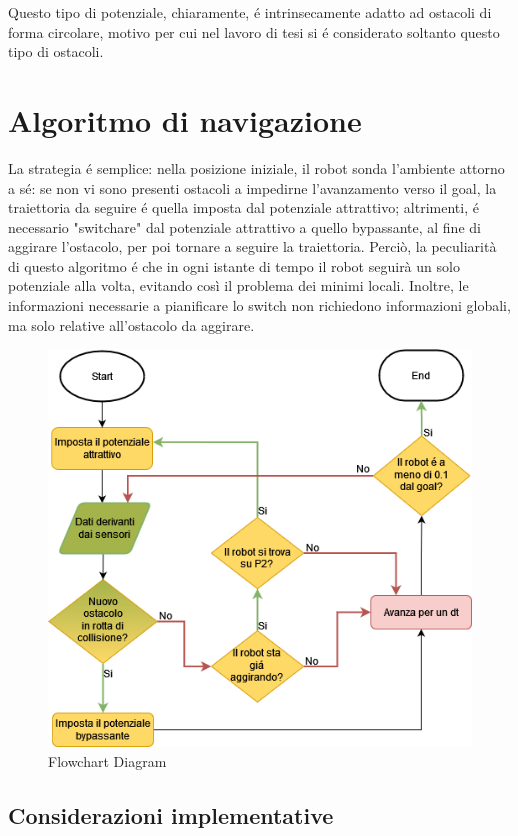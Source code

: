 \documentclass[14pt,a4paper]{extarticle}
\begin{document}
Questo tipo di potenziale, chiaramente, é intrinsecamente adatto ad ostacoli di forma circolare, motivo per cui nel lavoro di tesi si é considerato soltanto questo tipo di ostacoli.

\section{Algoritmo di navigazione\cite{dalfonso}} 
La strategia é semplice: nella posizione iniziale, il robot sonda l'ambiente attorno a sé: se non vi sono presenti ostacoli a impedirne l'avanzamento verso il goal, la traiettoria da seguire é quella imposta dal potenziale attrattivo; altrimenti, é necessario "switchare" dal potenziale attrattivo a quello bypassante, al fine di aggirare l'ostacolo, per poi tornare a seguire la traiettoria. Perciò, la peculiarità di questo algoritmo é che in ogni istante di tempo il robot seguirà un solo potenziale alla volta, evitando così il problema dei minimi locali. Inoltre, le informazioni necessarie a pianificare lo switch non richiedono informazioni globali, ma solo relative all'ostacolo da aggirare. 

\begin{figure}[H]
\caption{Flowchart Diagram} \label{flow}
\centering
\includegraphics[width=\textwidth]{flowchart.png}
\end{figure}

\subsection{Considerazioni implementative}
\end{document}
